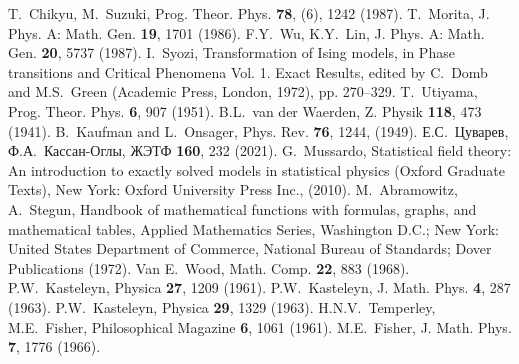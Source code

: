 \documentclass[utf8,12pt]{jetp}
\begin{document}
\begin{references}
 T.~Chikyu, M.~Suzuki, Prog. Theor. Phys. \textbf{78}, (6), 1242 (1987).
 T.~Morita, J. Phys. A: Math. Gen. \textbf{19}, 1701 (1986).
 F.Y.~Wu, K.Y.~Lin, J. Phys. A: Math. Gen. \textbf{20}, 5737 (1987).
 I.~Syozi, Transformation of Ising models, in Phase transitions and Critical Phenomena Vol. 1. Exact Results, edited by C.~Domb and M.S.~Green (Academic Press, London, 1972), pp. 270–329.
 T.~Utiyama, Prog. Theor. Phys. \textbf{6}, 907 (1951).
 B.L.~van der Waerden, Z. Physik \textbf{118}, 473 (1941).
 B.~Kaufman and L.~Onsager, Phys. Rev. \textbf{76}, 1244, (1949).
 Е.С.~Цуварев, Ф.А.~Кассан-Оглы, ЖЭТФ \textbf{160}, 232 (2021).
  G.~Mussardo, Statistical field theory: An introduction to exactly solved models in statistical physics (Oxford Graduate Texts), New York: Oxford University Press Inc., (2010).
 M.~Abramowitz, A.~Stegun, Handbook of mathematical functions with formulas, graphs, and mathematical tables, Applied Mathematics Series, Washington D.C.; New York: United States Department of Commerce, National Bureau of Standards; Dover Publications (1972).
 Van E.~Wood, Math. Comp. \textbf{22}, 883 (1968).
 P.W.~Kasteleyn, Physica \textbf{27}, 1209 (1961).
 P.W.~Kasteleyn, J. Math. Phys. \textbf{4}, 287 (1963).
 P.W.~Kasteleyn, Physica \textbf{29}, 1329 (1963).
 H.N.V.~Temperley, M.E.~Fisher, Philosophical Magazine \textbf{6}, 1061 (1961).
 M.E.~Fisher, J. Math. Phys. \textbf{7}, 1776 (1966).





\end{references}
	
\end{document}
